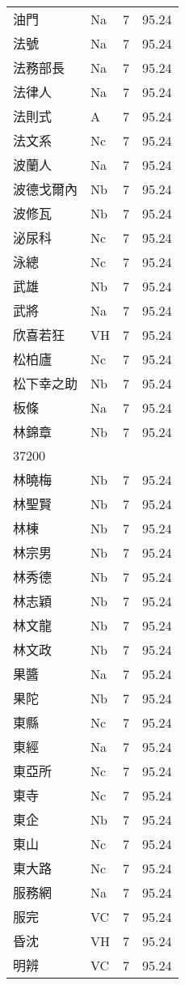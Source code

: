 \documentclass[twocolumn]{book}
\begin{document}
\begin{supertabular}{llrr}
油門 & Na & 7 &  95.24\\
法號 & Na & 7 &  95.24\\
法務部長 & Na & 7 &  95.24\\
法律人 & Na & 7 &  95.24\\
法則式 & A & 7 &  95.24\\
法文系 & Nc & 7 &  95.24\\
波蘭人 & Na & 7 &  95.24\\
波德戈爾內 & Nb & 7 &  95.24\\
波修瓦 & Nb & 7 &  95.24\\
泌尿科 & Nc & 7 &  95.24\\
泳總 & Nc & 7 &  95.24\\
武雄 & Nb & 7 &  95.24\\
武將 & Na & 7 &  95.24\\
欣喜若狂 & VH & 7 &  95.24\\
松柏廬 & Nc & 7 &  95.24\\
松下幸之助 & Nb & 7 &  95.24\\
板條 & Na & 7 &  95.24\\
林錦章 & Nb & 7 &  95.24\\
37200\\
林曉梅 & Nb & 7 &  95.24\\
林聖賢 & Nb & 7 &  95.24\\
林棟 & Nb & 7 &  95.24\\
林宗男 & Nb & 7 &  95.24\\
林秀德 & Nb & 7 &  95.24\\
林志穎 & Nb & 7 &  95.24\\
林文龍 & Nb & 7 &  95.24\\
林文政 & Nb & 7 &  95.24\\
果醬 & Na & 7 &  95.24\\
果陀 & Nb & 7 &  95.24\\
東縣 & Nc & 7 &  95.24\\
東經 & Na & 7 &  95.24\\
東亞所 & Nc & 7 &  95.24\\
東寺 & Nc & 7 &  95.24\\
東企 & Nb & 7 &  95.24\\
東山 & Nc & 7 &  95.24\\
東大路 & Nc & 7 &  95.24\\
服務網 & Na & 7 &  95.24\\
服完 & VC & 7 &  95.24\\
昏沈 & VH & 7 &  95.24\\
明辨 & VC & 7 &  95.24\\

\end{supertabular}
\end{document}
